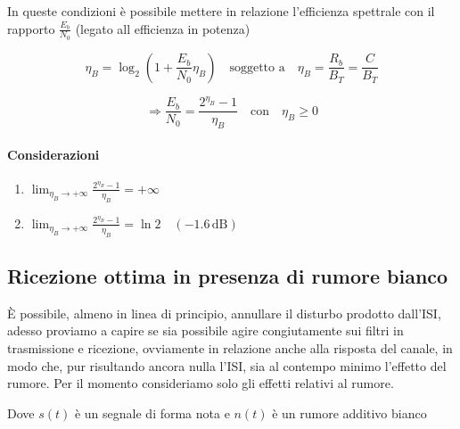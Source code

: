 In queste condizioni è possibile mettere in relazione l'efficienza spettrale con il rapporto \( \frac{E_b}{N_0} \) (legato all
efficienza in potenza)

\[
    \eta_B = \log_2 \left( 1 + \frac{E_b}{N_0} \eta_B  \right) \quad \text{soggetto a} \quad  \eta_B = \frac{R_b}{B_T} = \frac{C}{B_T}
\]

\[
    \Rightarrow \frac{E_b}{N_0} = \frac{2^{\eta_B} - 1}{\eta_B} \quad \text{con} \quad \eta_B \geq 0
\]


\paragraph*{Considerazioni}

\begin{enumerate}
    \item
          $\lim_{\eta_B \to +\infty} \frac{2^{\eta_B } - 1}{\eta_B } = +\infty$


    \item $\lim_{\eta_B \to +\infty} \frac{2^{\eta_B } - 1}{\eta_B } = \ln{2} \quad (-1.6 \, \text{dB})$

\end{enumerate}


\subsection*{Ricezione ottima in presenza di rumore bianco}
È possibile, almeno in linea di principio, annullare il disturbo prodotto dall'ISI, 
adesso proviamo a capire se sia possibile agire congiutamente sui filtri in trasmissione
 e ricezione, ovviamente in relazione anche alla risposta del canale,
  in modo che, pur risultando ancora nulla l'ISI, sia al contempo minimo l'effetto del rumore. 
Per il momento consideriamo solo gli effetti relativi al rumore.

\begin{center}
\end{center}
Dove \( s(t) \) è un segnale di forma nota e \( n(t) \) è un rumore additivo bianco

